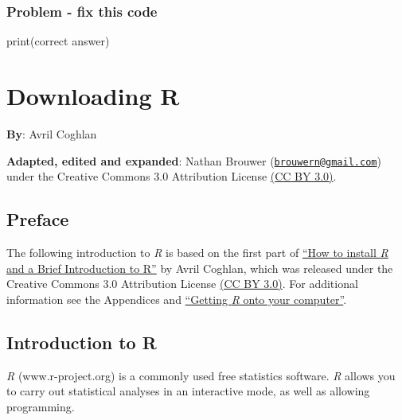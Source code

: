 \documentclass[
]{book}
\newenvironment{Shaded}{\begin{snugshade}}{\end{snugshade}}
\newcommand{\FunctionTok}[1]{\textcolor[rgb]{0.00,0.00,0.00}{#1}}
\newcommand{\NormalTok}[1]{#1}
\begin{document}
\hypertarget{problem---fix-this-code}{%
\subsection{Problem - fix this code}\label{problem---fix-this-code}}

\begin{Shaded}
\begin{Highlighting}[]
\FunctionTok{print}\NormalTok{(correct answer)}
\end{Highlighting}
\end{Shaded}

\hypertarget{downloading-r}{%
\chapter{Downloading R}\label{downloading-r}}

\textbf{By}: Avril Coghlan

\textbf{Adapted, edited and expanded}: Nathan Brouwer (\href{mailto:brouwern@gmail.com}{\nolinkurl{brouwern@gmail.com}}) under the Creative Commons 3.0 Attribution License \href{https://creativecommons.org/licenses/by/3.0/}{(CC BY 3.0)}.

\hypertarget{preface}{%
\section{Preface}\label{preface}}

The following introduction to \emph{R} is based on the first part of \href{https://a-little-book-of-r-for-bioinformatics.readthedocs.io/en/latest/src/installr.html}{``How to install \emph{R} and a Brief Introduction to R''} by Avril Coghlan, which was released under the Creative Commons 3.0 Attribution License \href{https://creativecommons.org/licenses/by/3.0/}{(CC BY 3.0)}. For additional information see the Appendices and \href{https://brouwern.github.io/BOOK_R_Ecological_Data_Science/getting-r-onto-your-computer.html}{``Getting \emph{R} onto your computer''}.

\hypertarget{introduction-to-r}{%
\section{Introduction to R}\label{introduction-to-r}}

\emph{R} (www.r-project.org) is a commonly used free statistics software. \emph{R} allows you to carry out statistical analyses in an interactive mode, as well as allowing programming.
\end{document}
